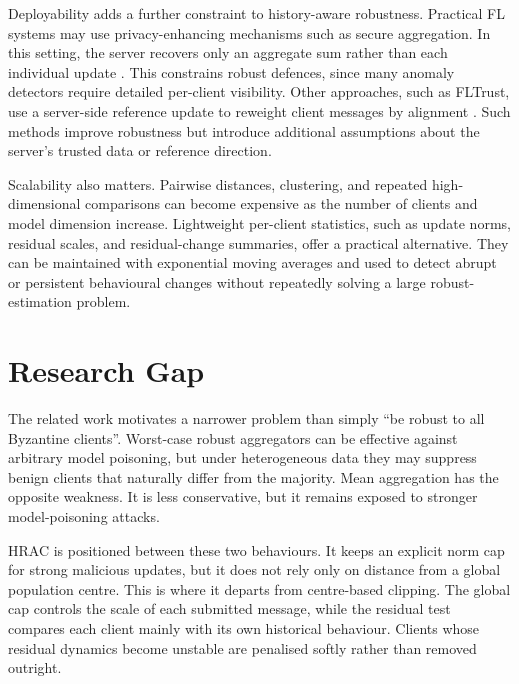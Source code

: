 Deployability adds a further constraint to history-aware robustness. Practical
FL systems may use privacy-enhancing mechanisms such as secure aggregation. In
this setting, the server recovers only an aggregate sum rather than each
individual update \cite{BonawitzIvanovKreuter:17}. This constrains robust
defences, since many anomaly detectors require detailed per-client visibility.
Other approaches, such as FLTrust, use a server-side reference update to
reweight client messages by alignment \cite{DBLP:journals/corr/abs-2012-13995}.
Such methods improve robustness but introduce additional assumptions about the
server's trusted data or reference direction.

Scalability also matters. Pairwise distances, clustering, and repeated
high-dimensional comparisons can become expensive as the number of clients and
model dimension increase. Lightweight per-client statistics, such as update
norms, residual scales, and residual-change summaries, offer a practical
alternative. They can be maintained with exponential moving averages and used to
detect abrupt or persistent behavioural changes without repeatedly solving a
large robust-estimation problem.

\section{Research Gap}

The related work motivates a narrower problem than simply ``be robust to all
Byzantine clients''. Worst-case robust aggregators can be effective against
arbitrary model poisoning, but under heterogeneous data they may suppress
benign clients that naturally differ from the majority. Mean aggregation has
the opposite weakness. It is less conservative, but it remains exposed to
stronger model-poisoning attacks.

HRAC is positioned between these two behaviours. It keeps an explicit norm cap
for strong malicious updates, but it does not rely only on distance from a
global population centre. This is where it departs from centre-based clipping.
The global cap controls the scale of each submitted message, while the residual
test compares each client mainly with its own historical behaviour. Clients
whose residual dynamics become unstable are penalised softly rather than
removed outright.

